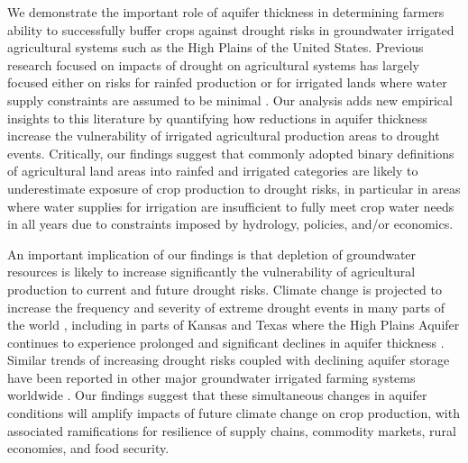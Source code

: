 \documentclass[
]{article}
\begin{document}
We demonstrate the important role of aquifer thickness in determining farmers ability to successfully buffer crops against drought risks in groundwater irrigated agricultural systems such as the High Plains of the United States. Previous research focused on impacts of drought on agricultural systems has largely focused either on risks for rainfed production \citep{schlenker2009nonlinear, lobell2014greater, schlenker2010robust, zhou2020connections, borgomeo2020impact} or for irrigated lands where water supply constraints are assumed to be minimal \citep{kuwayama2019estimating, zipper2016drought, zhu2022untangling, zhu2022warming, lu2020mapping, davis2019sensitivity, li2018changes, luan2021combined}. Our analysis adds new empirical insights to this literature by quantifying how reductions in aquifer thickness increase the vulnerability of irrigated agricultural production areas to drought events. Critically, our findings suggest that commonly adopted binary definitions of agricultural land areas into rainfed and irrigated categories are likely to underestimate exposure of crop production to drought risks, in particular in areas where water supplies for irrigation are insufficient to fully meet crop water needs in all years due to constraints imposed by hydrology, policies, and/or economics.

An important implication of our findings is that depletion of groundwater resources is likely to increase significantly the vulnerability of agricultural production to current and future drought risks. Climate change is projected to increase the frequency and severity of extreme drought events in many parts of the world \citep{ukkola2020robust, chiang2021evidence, cook2020twenty}, including in parts of Kansas and Texas \citep{bradford2020robust, cook2022projected, mullens2019quantitative} where the High Plains Aquifer continues to experience prolonged and significant declines in aquifer thickness \citep{scanlon2012groundwater, haacker2016water, cotterman2018groundwater}. Similar trends of increasing drought risks coupled with declining aquifer storage have been reported in other major groundwater irrigated farming systems worldwide \citep{wada2010global, doll2014global, famiglietti2014global, feng2018groundwater, bierkens2019non}. Our findings suggest that these simultaneous changes in aquifer conditions will amplify impacts of future climate change on crop production, with associated ramifications for resilience of supply chains, commodity markets, rural economies, and food security.
\end{document}
